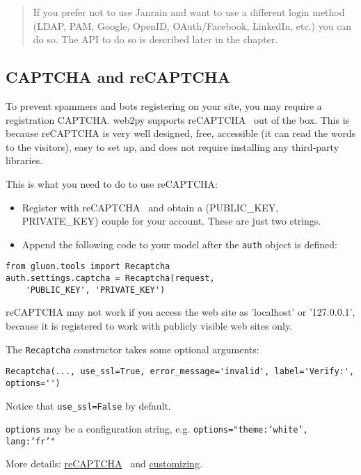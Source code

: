 \documentclass[justified,sixbynine,notoc]{tufte-book}
\def\ft{\small\tt}
\def\inxx#1{\index{#1}}
\begin{document}
\begin{fullwidth}
\begin{quote}
If you prefer not to use Janrain and want to use a different login method (LDAP, PAM, Google, OpenID, OAuth/Facebook, LinkedIn, etc.) you can do so. The API to do so is described later in the chapter.\end{quote}
\goodbreak\subsection{CAPTCHA and reCAPTCHA}

\inxx{CAPTCHA} \inxx{reCAPTCHA} \inxx{PIL}
To prevent spammers and bots registering on your site, you may require a registration CAPTCHA. web2py supports reCAPTCHA~\cite{recaptcha}  out of the box. This is because reCAPTCHA is very well designed, free, accessible (it can read the words to the visitors), easy to set up, and does not require installing any third-party libraries.

This is what you need to do to use reCAPTCHA:
\begin{itemize}
\item Register with reCAPTCHA~\cite{recaptcha}  and obtain a (PUBLIC\_KEY, PRIVATE\_KEY) couple for your account. These are just two strings.

\item Append the following code to your model after the {\ft auth} object is defined:
\end{itemize}
\begin{lstlisting}
from gluon.tools import Recaptcha
auth.settings.captcha = Recaptcha(request,
    'PUBLIC_KEY', 'PRIVATE_KEY')
\end{lstlisting}
\noindent reCAPTCHA may not work if you access the web site as 'localhost' or '127.0.0.1', because it is registered to work with publicly visible web sites only.

The {\ft Recaptcha} constructor takes some optional arguments:
\begin{lstlisting}
Recaptcha(..., use_ssl=True, error_message='invalid', label='Verify:', options='')
\end{lstlisting}

Notice that {\ft use\_ssl=False} by default.

{\ft options} may be a configuration string, e.g. {\ft options="theme:'white', lang:'fr'"}

More details: {\footnotesize\href{http://www.google.com/recaptcha}{reCAPTCHA}}~\cite{recaptchagoogle}  and {\footnotesize\href{http://code.google.com/apis/recaptcha/docs/customization.html}{customizing}}.


\end{fullwidth}
\end{document}
